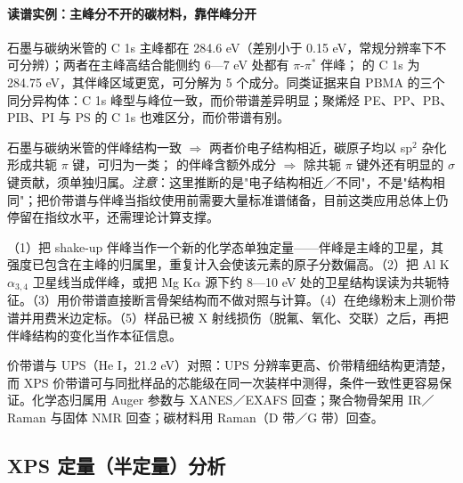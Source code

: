 \paragraph{读谱实例：主峰分不开的碳材料，靠伴峰分开}
\begin{obs}
石墨与碳纳米管的 C 1s 主峰都在 284.6 eV（差别小于 0.15 eV，常规分辨率下不可分辨）；两者在主峰高结合能侧约 6—7 eV 处都有 $\pi$-$\pi^{*}$ 伴峰； 的 C 1s 为 284.75 eV，其伴峰区域更宽，可分解为 5 个成分。同类证据来自 PBMA 的三个同分异构体：C 1s 峰型与峰位一致，而价带谱差异明显；聚烯烃 PE、PP、PB、PIB、PI 与 PS 的 C 1s 也难区分，而价带谱有别。
\end{obs}
\begin{infer}
石墨与碳纳米管的伴峰结构一致 $\Rightarrow$ 两者价电子结构相近，碳原子均以 sp$^{2}$ 杂化形成共轭 $\pi$ 键，可归为一类； 的伴峰含额外成分 $\Rightarrow$ 除共轭 $\pi$ 键外还有明显的 $\sigma$ 键贡献，须单独归属。\emph{注意}：这里推断的是"电子结构相近／不同"，不是"结构相同"；把价带谱与伴峰当指纹使用前需要大量标准谱储备，目前这类应用总体上仍停留在指纹水平，还需理论计算支撑。
\end{infer}

\begin{pitfall}
（1）把 shake-up 伴峰当作一个新的化学态单独定量——伴峰是主峰的卫星，其强度已包含在主峰的归属里，重复计入会使该元素的原子分数偏高。（2）把 Al K$\alpha_{3,4}$ 卫星线当成伴峰，或把 Mg K$\alpha$ 源下约 8—10 eV 处的卫星结构误读为共轭特征。（3）用价带谱直接断言骨架结构而不做对照与计算。（4）在绝缘粉末上测价带谱并用费米边定标。（5）样品已被 X 射线损伤（脱氟、氧化、交联）之后，再把伴峰结构的变化当作本征信息。
\end{pitfall}

\begin{crosscheck}
价带谱与 UPS（He I，21.2 eV）对照：UPS 分辨率更高、价带精细结构更清楚，而 XPS 价带谱可与同批样品的芯能级在同一次装样中测得，条件一致性更容易保证。化学态归属用 Auger 参数与 XANES／EXAFS 回查；聚合物骨架用 IR／Raman 与固体 NMR 回查；碳材料用 Raman（D 带／G 带）回查。
\end{crosscheck}

\subsection{XPS 定量（半定量）分析}
\label{sec:ch09-quant}


